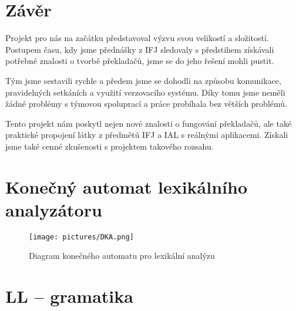 \documentclass[a4paper, 11pt]{article}
\begin{document}
\section{Závěr}

Projekt pro nás na začátku představoval výzvu svou velikostí a složitostí. 
Postupem času, kdy jsme přednášky z IFJ sledovaly s předstihem získávali potřebné znalosti o tvorbě překladačů, jsme se do jeho řešení mohli pustit.

Tým jsme sestavili rychle a předem jsme se dohodli na způsobu komunikace, pravidelných setkáních a využití verzovacího systému. 
Díky tomu jsme neměli žádné problémy s týmovou spoluprací a práce probíhala bez větších problémů.

Tento projekt nám poskytl nejen nové znalosti o fungování překladačů, ale také praktické propojení látky z předmětů IFJ a IAL s reálnými aplikacemi. 
Získali jsme také cenné zkušenosti s projektem takového rozsahu.

\newpage



\appendix
\newpage
\section{Konečný automat lexikálního analyzátoru} \label{DKA}
\bigskip
\begin{figure}[h]
    \scalebox{0.343}
    {\texttt{[image: pictures/DKA.png]}}
    \caption{Diagram konečného automatu pro lexikální analýzu}
\end{figure}
\newpage

\section{LL -- gramatika} \label{GRA}
\end{document}
